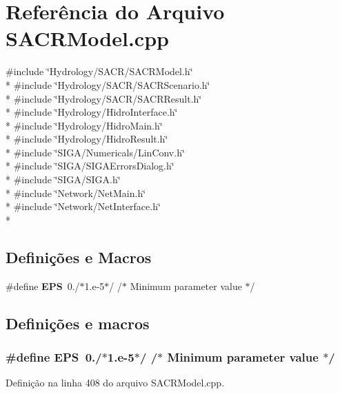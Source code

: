 \section{Referência do Arquivo S\+A\+C\+R\+Model.\+cpp}
\label{_s_a_c_r_model_8cpp}
{\ttfamily \#include \char`\"{}Hydrology/\+S\+A\+C\+R/\+S\+A\+C\+R\+Model.\+h\char`\"{}}\\*
{\ttfamily \#include \char`\"{}Hydrology/\+S\+A\+C\+R/\+S\+A\+C\+R\+Scenario.\+h\char`\"{}}\\*
{\ttfamily \#include \char`\"{}Hydrology/\+S\+A\+C\+R/\+S\+A\+C\+R\+Result.\+h\char`\"{}}\\*
{\ttfamily \#include \char`\"{}Hydrology/\+Hidro\+Interface.\+h\char`\"{}}\\*
{\ttfamily \#include \char`\"{}Hydrology/\+Hidro\+Main.\+h\char`\"{}}\\*
{\ttfamily \#include \char`\"{}Hydrology/\+Hidro\+Result.\+h\char`\"{}}\\*
{\ttfamily \#include \char`\"{}S\+I\+G\+A/\+Numericals/\+Lin\+Conv.\+h\char`\"{}}\\*
{\ttfamily \#include \char`\"{}S\+I\+G\+A/\+S\+I\+G\+A\+Errors\+Dialog.\+h\char`\"{}}\\*
{\ttfamily \#include \char`\"{}S\+I\+G\+A/\+S\+I\+G\+A.\+h\char`\"{}}\\*
{\ttfamily \#include \char`\"{}Network/\+Net\+Main.\+h\char`\"{}}\\*
{\ttfamily \#include \char`\"{}Network/\+Net\+Interface.\+h\char`\"{}}\\*
\subsection*{Definições e Macros}
\begin{DoxyCompactItemize}
\item 
\#define {\bf E\+PS}~0./$\ast$1.e-\/5$\ast$/ /$\ast$ Minimum parameter value $\ast$/
\end{DoxyCompactItemize}


\subsection{Definições e macros}
\subsubsection[{E\+PS}]{\setlength{\rightskip}{0pt plus 5cm}\#define E\+PS~0./$\ast$1.e-\/5$\ast$/ /$\ast$ Minimum parameter value $\ast$/}\label{_s_a_c_r_model_8cpp_a6ebf6899d6c1c8b7b9d09be872c05aae}


Definição na linha 408 do arquivo S\+A\+C\+R\+Model.\+cpp.

